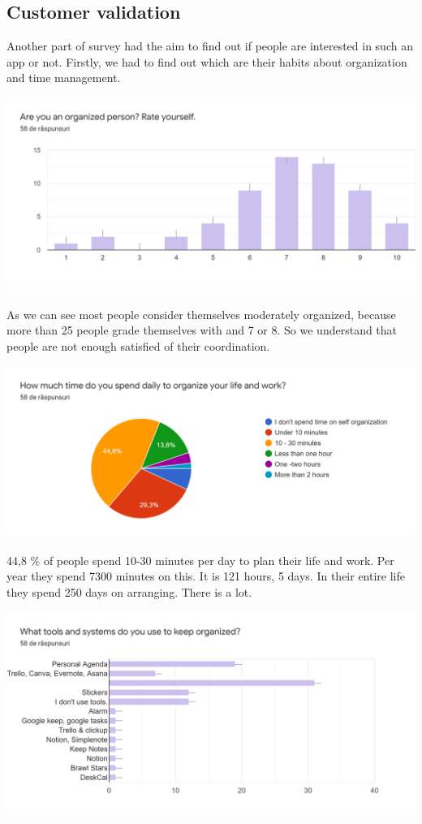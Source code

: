\subsection{Customer validation}
\par Another part of survey had the aim to find out if people are interested in such an app or not. Firstly, we had to find out which are their habits about organization and time management. 
\par
\includegraphics[width=\textwidth]{CustomerValidation1}
\par As we can see most people consider themselves moderately organized, because more than 25 people grade themselves with and 7 or 8. So we understand that people are not enough satisfied of their coordination.
\par
\includegraphics[width=\textwidth]{CustomerValidation2}
\par 44,8 \% of people spend 10-30 minutes per day to plan their life and work. Per year they spend 7300 minutes on this. It is 121 hours, 5 days. In their entire life they spend 250 days on arranging. There is a lot.
\par
\includegraphics[width=\textwidth]{CustomerValidation3}
